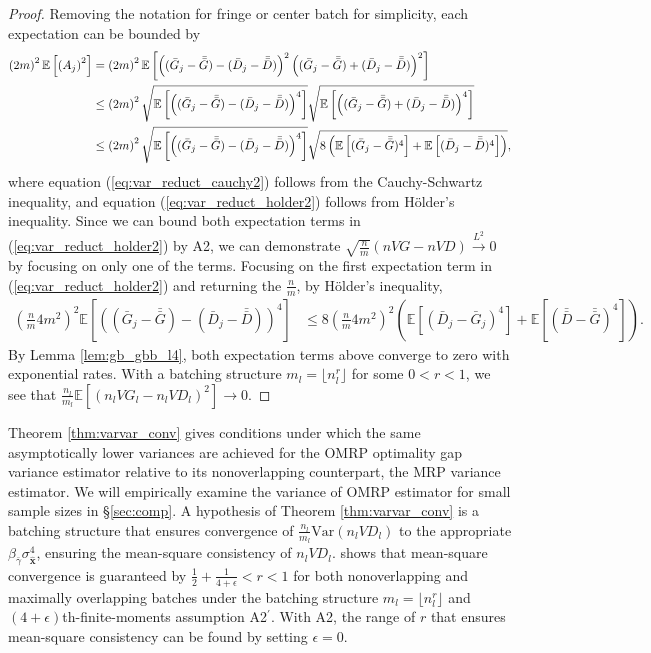\documentclass[12pt]{article}
\newcommand{\e}[1]{\mathbb{E} \left[ #1 \right]
}
\newcommand{\var}[1]{\mathrm{Var} \left( #1 \right)}
\newcommand{\x}{\mathbf{x}}
\newcommand{\xh}{{\hat{\x}}}
\newcommand{\gammab}{\bar{\gamma}}
\newcommand{\gb}{\bar{G}}
\newcommand{\gbb}{\bar{\gb}}
\newcommand{\db}{\bar{D}}
\newcommand{\dbb}{\bar{\db}}
\begin{document}
\begin{proof}
        Removing the notation for fringe or center batch for simplicity, each expectation can be bounded by
	\begin{align}
		\left( 2m \right)^2 \e{ \left( A_j \right)^2 } & = \left( 2m \right)^2 \e{ \left((\gb_j - \gbb) - (\db_j - \dbb)\right)^2 \left((\gb_j - \gbb) + (\db_j - \dbb)\right)^2 } \notag \\
		& \leq \left( 2m \right)^2 \sqrt{\e{\left((\gb_j - \gbb) - (\db_j - \dbb)\right)^4}} \sqrt{\e{\left((\gb_j - \gbb) + (\db_j - \dbb)\right)^4 }} \label{eq:var_reduct_cauchy2} \\
		& \leq \left( 2m \right)^2 \sqrt{\e{\left((\gb_j - \gbb) - (\db_j - \dbb)\right)^4}} \sqrt{8 \left(\e{(\gb_j - \gbb)^4} + \e{(\db_j - \dbb)^4} \right)}, \label{eq:var_reduct_holder2}
	\end{align}
	where equation (\ref{eq:var_reduct_cauchy2}) follows from the Cauchy-Schwartz inequality, and equation (\ref{eq:var_reduct_holder2}) follows from H\"{o}lder's inequality.  
        Since we can bound both expectation terms in (\ref{eq:var_reduct_holder2}) by A2, we can demonstrate $\sqrt{\frac{n}{m}}(nVG - nVD) \xrightarrow{L^2} 0$ by focusing on only one of the terms.  
        Focusing on the first expectation term in (\ref{eq:var_reduct_holder2}) and returning the $\tfrac{n}{m}$, by H\"{o}lder's inequality,
	\begin{align*}
		\left(\frac{n}{m} 4m^2\right)^2 \e{\left((\gb_j - \gbb) - (\db_j - \dbb)\right)^4}	& \leq 8 \left( \frac{n}{m} 4m^2\right)^2 \left( \e{(\db_j - \gb_j)^4} + \e{(\dbb - \gbb)^4} \right).
	\end{align*}	
	By Lemma \ref{lem:gb_gbb_l4}, both expectation terms above converge to zero with exponential rates.  
        With a batching structure $m_l = \lfloor n_l^r \rfloor$ for some $0<r<1$, we see that $\frac{n_l}{m_l} \e{(n_l VG_l - n_l VD_l)^2} \rightarrow 0$.
\end{proof} 


Theorem \ref{thm:varvar_conv} gives conditions under which the same asymptotically lower variances are achieved for the OMRP optimality gap variance estimator relative to its nonoverlapping counterpart, the MRP variance estimator. 
We will empirically examine the variance of OMRP estimator for small sample sizes in \S \ref{sec:comp}. 
A hypothesis of Theorem \ref{thm:varvar_conv} is a batching structure that ensures convergence of $\frac{n_l}{m_l}\var{n_l VD_l}$ to the appropriate $\beta_{\gammab} \sigma^4_{\xh}$, ensuring the mean-square consistency of $n_l VD_l$. 
\citet{damerdji1995mean} shows that mean-square convergence is guaranteed by $\tfrac{1}{2} + \tfrac{1}{4+\epsilon} < r < 1$ for both nonoverlapping and maximally overlapping batches under the batching structure $m_l = \lfloor n_l^r \rfloor$ and $(4+\epsilon)$th-finite-moments assumption A2$^\prime$.  
With A2, the range of $r$ that ensures mean-square consistency can be found by setting $\epsilon=0$.
\end{document}

